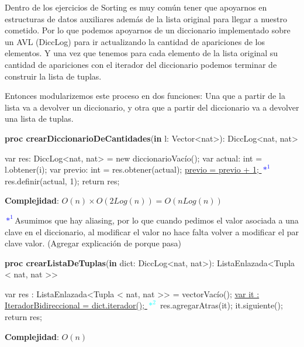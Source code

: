 \documentclass{article}
\newcommand{\Complexity}[1]{\textbf{Complejidad}: #1}
\begin{document}
Dentro de los ejercicios de Sorting es muy común tener que apoyarnos en estructuras de datos auxiliares además de la lista original para llegar a nuestro cometido. Por lo que podemos apoyarnos de un diccionario implementado sobre un AVL (DiccLog) para ir actualizando la cantidad de apariciones de los elementos. Y una vez que tenemos para cada elemento de la lista original su cantidad de apariciones con el iterador del diccionario podemos terminar de construir la lista de tuplas.

Entonces modularizemos este proceso en dos funciones: Una que a partir de la lista va a devolver un diccionario, y otra que a partir del diccionario va a devolver una lista de tuplas. 
\begin{algorithm}[H]
    \caption{
        \textbf{proc crearDiccionarioDeCantidades}(\textbf{in} l: \textnormal{Vector\textless{}nat\textgreater{}}): \textnormal{DiccLog\textless{}nat, nat\textgreater{}}
    }
    \begin{algorithmic}[1]
        \State var res: \textnormal{DiccLog\textless{}nat, nat\textgreater{}} = new diccionarioVacío();  
         
            \State var actual: int = l.obtener(i); 
             
                \State var previo: int = res.obtener(actual); 
                \State \hyperref[sec:explanation1]{previo = previo + 1; \textcolor{blue}{$*^{1}$}}
            \Else
                \State res.definir(actual, 1); 
            \EndIf 
        \EndFor
    \State return res;
    \end{algorithmic}
    \Complexity{$O(n) \times O(2Log(n)) = O(nLog(n))$}
\end{algorithm}

\label{sec:explanation1}
\textcolor{blue}{$*^{1}$}Asumimos que hay aliasing, por lo que cuando pedimos el valor asociada a una clave en el diccionario, al modificar el valor no hace falta volver a modificar el par clave valor. (Agregar explicación de porque pasa)
\begin{algorithm}[H]
    \caption{
        \textbf{proc crearListaDeTuplas}(\textbf{in} dict: \textnormal{DiccLog\textless{}nat, nat\textgreater{}}): \textnormal{ListaEnlazada\textless{}Tupla \textless{} nat, nat \textgreater{}\textgreater{}}
    }
    \begin{algorithmic}[1]
        \State var res : ListaEnlazada\textless{}Tupla \textless{} nat, nat \textgreater{}\textgreater{} = vectorVacío(); 
        \State \hyperref[sec:explanation2] {var it : IteradorBidireccional = dict.iterador(); \textcolor{cyan}{$*^{2}$}}  
          
            \State res.agregarAtras(it); 
            \State it.siguiente();
        \EndWhile
        \State return res;
    \end{algorithmic}
    \Complexity{$O(n)$}
\end{algorithm}
\label{sec:explanation1}
\end{document}
